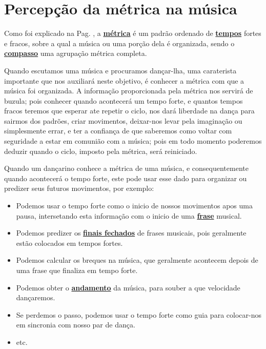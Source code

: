 
\section{Percepção da métrica na música}

Como foi explicado na Pag. \pageref{def:Metrica}, 
a \hyperref[def:Metrica]{\textbf{métrica}} é um padrão ordenado de \hyperref[sec:Tempo]{\textbf{tempos}} fortes e fracos,
sobre a qual a música ou uma porção dela é organizada, 
sendo o \hyperref[def:Compasso]{\textbf{compasso}} uma agrupação métrica completa.

Quando escutamos uma música e procuramos dançar-lha, 
uma caraterista importante que nos auxiliará neste objetivo,
é conhecer a métrica com que a música foi organizada.
A informação proporcionada pela métrica nos servirá de buzula;
pois conhecer quando acontecerá um tempo forte, 
e quantos tempos fracos teremos que esperar ate repetir o ciclo,
nos dará liberdade na dança para sairmos dos padrões, criar movimentos, deixar-nos levar pela imaginação ou simplesmente errar,
 e ter a confiança de que saberemos como voltar com seguridade a estar em comunião com a música;
pois em todo momento poderemos deduzir quando o ciclo, imposto pela métrica, será reiniciado.

Quando um dançarino conhece a métrica de uma música,
e consequentemente quando acontecerá o tempo forte,
este pode usar esse dado para  organizar ou predizer seus futuros movimentos, 
por exemplo:
\begin{itemize}
\item Podemos usar o tempo forte como o inicio de nossos movimentos apos uma pausa,  
intersetando esta informação com o inicio de uma \hyperref[sec:Frase]{\textbf{frase}} musical.
\item Podemos predizer os \hyperref[subsec:FinalAbertoFechado]{\textbf{finais fechados}} 
de frases musicais,
 pois geralmente estão colocados em tempos fortes.
\item Podemos calcular os breques na música, que geralmente  acontecem depois de uma frase que finaliza em tempo forte.
\item Podemos obter o \hyperref[sec:Andamento]{\textbf{andamento}} da música,
para souber a que velocidade dançaremos. 
\item Se perdemos o passo, podemos usar o tempo forte como guia para colocar-nos em sincronia com nosso par de dança.
\item etc.
\end{itemize}

